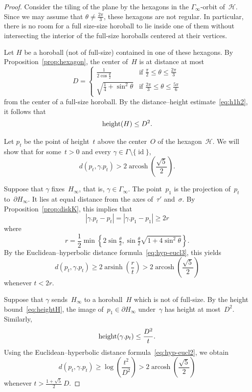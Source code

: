 \documentclass[10pt,a4paper]{amsart}
\DeclareMathOperator{\arcosh}{arcosh}
\DeclareMathOperator{\arsinh}{arsinh}
\DeclareMathOperator{\height}{{\rm height}}
\DeclareMathOperator{\id}{id}
\begin{document}
\begin{proof}
Consider the tiling of the plane by the hexagons in the $\Gamma_\infty$-orbit of~$\mathcal{H}$.
Since we may assume that $\theta \neq \frac{2\pi}{3}$, these hexagons are not regular.
In particular, there is no room for a full size-size horoball to lie inside one of them without intersecting the interior of the full-size horoballs centered at their vertices.

Let $H$ be a horoball (not of full-size) contained in one of these hexagons.
By Proposition~\ref{prop:hexagon}, the center of~$H$ is at distance at most
\[
D=
\begin{cases}
\frac{1}{2 \cos \frac{\theta}{2}} & \text{if } \frac{\pi}{2} \leq \theta \leq \frac{2\pi}{3} \\
\sqrt{\frac{1}{4} + \sin^2 \theta} & \text{if } \frac{2\pi}{3} \leq \theta \leq \frac{5\pi}{6}
\end{cases}
\]
from the center of a full-size horoball.
By the distance--height estimate~\eqref{eq:h1h2}, it follows that
\begin{equation} \label{eq:heightH}
\height(H) \leq D^2.
\end{equation}

Let $p_t$ be the point of height~$t$ above the center~$O$ of the hexagon~$\mathcal{H}$.
We will show that for some~$t>0$ and every $\gamma \in \Gamma \setminus \{ \id \}$,
\[
d(p_t,\gamma.p_t) > 2 \arcosh \left( \frac{\sqrt{5}}{2} \right).
\]

Suppose that $\gamma$ fixes~$H_\infty$, that is, $\gamma \in \Gamma_\infty$.
The point~$p_1$ is the projection of~$p_t$ to~$\partial H_\infty$.
It lies at equal distance from the axes of~$\tau'$ and~$\sigma$.
By Proposition~\ref{prop:diskK}, this implies that
\[
|\gamma.p_t-p_t| = |\gamma.p_1-p_1| \geq 2r
\]
where
\[
r = \frac{1}{2} \min \left\{ 2 \sin \tfrac{\theta}{2}, \sin \tfrac{\theta}{2} \sqrt{1+4 \sin^2 \theta} \right\}.
\]
By the Euclidean--hyperbolic distance formula~\eqref{eq:hyp-eucl3}, this yields
\begin{equation} \label{eq:gamma1}
d(p_t,\gamma.p_t) \geq 2 \arsinh \left( \frac{r}{t} \right) > 2 \arcosh \left( \frac{\sqrt{5}}{2} \right)
\end{equation}
whenever $t<2r$.

\medskip

Suppose that $\gamma$ sends~$H_\infty$ to a horoball~$H$ which is not of full-size.
By the height bound~\eqref{eq:heightH}, the image of~$p_1 \in \partial H_\infty$ under~$\gamma$ has height at most~$D^2$.
Similarly,
\[
\height(\gamma.p_t) \leq \frac{D^2}{t}.
\]
Using the Euclidean--hyperbolic distance formula~\eqref{eq:hyp-eucl2}, we obtain
\begin{equation} \label{eq:gamma2}
d(p_t,\gamma.p_t) \geq \log \left( \frac{t^2}{D^2} \right) > 2 \arcosh \left( \frac{\sqrt{5}}{2} \right)
\end{equation}
whenever $t > \frac{1+\sqrt{5}}{2} \, D$.


\end{proof}
\end{document}
